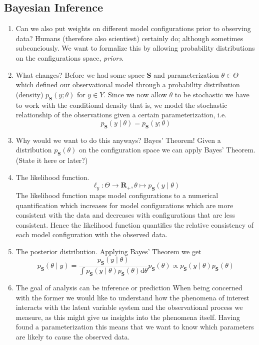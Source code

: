 \subsection{Bayesian Inference}
\begin{enumerate}
  \item Can we also put weights on different model configurations prior to observing data? Humans (therefore also scientiest) certainly do; although sometimes subconciously. We want to formalize this by allowing probability distributions on the configurations space, \emph{priors}.
  \item What changes? Before we had some space $\mathbf{S}$ and parameterization $\theta \in \Theta$ which defined our observational model through a probability distribution (density) $p_{\mathbf{S}}(y; \theta)$ for $y \in Y$.
    Since we now allow $\theta$ to be stochastic we have to work with the conditional density that is, we model the stochastic relationship of the observations given a certain parameterization, i.e. $$p_{\mathbf{S}}(y \mid \theta) = p_{\mathbf{S}}(y; \theta)$$
  \item Why would we want to do this anyways? Bayes' Theorem!
    Given a distribution $p_{\mathbf{S}}(\theta)$ on the configuration space we can apply Bayes' Theorem. (State it here or later?)
  \item The likelihood function.$$\ell_{y} : \Theta \to \mathbf{R}_+, \theta \mapsto p_{\mathbf{S}}(y \mid \theta)$$
    The likelihood function maps model configurations to a numerical quantification which increases for model configurations which are more consistent with the data and decreases with configurations that are less consistent.
    Hence the likelihood function quantifies the relative consistency of each model configuration with the observed data.
  \item The posterior distribution. Applying Bayes' Theorem we get $$p_{\mathbf{S}}(\theta \mid y) = \frac{p_{\mathbf{S}}(y \mid \theta)}{\int p_{\mathbf{S}}(y \mid \theta) p_{\mathbf{S}}(\theta) \mathrm{d}\theta} p_{\mathbf{S}} (\theta) \propto p_{\mathbf{S}}(y \mid \theta) p_{\mathbf{S}}(\theta)$$
  \item The goal of analysis can be inference or prediction
    When being concerned with the former we would like to understand how the phenomena of interest interacts with the latent variable system and the observational process we measure, as this might give us insights into the phenomena itself.
    Having found a parameterization this means that we want to know which parameters are likely to cause the observed data.

\end{enumerate}
